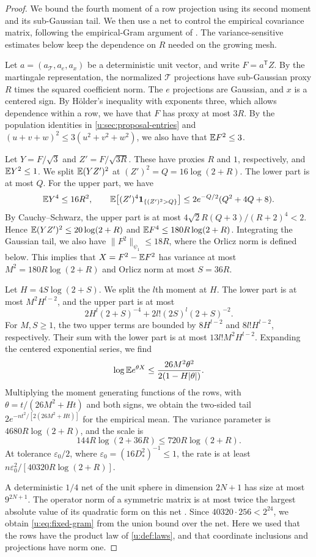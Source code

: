 \begin{proof}
We bound the fourth moment of a row projection using its second moment
and its sub-Gaussian tail. We then use a net to control the empirical
covariance matrix, following the empirical-Gram argument of
\cite[Section~4, proof of Proposition~5]{oai-typical-upper}. The
variance-sensitive estimates below keep the dependence on $R$ needed
on the growing mesh.

Let $a=(a_{\mathcal T},a_e,a_x)$ be a deterministic unit vector, and
write $F=a^{\mathsf T}Z$. By the martingale representation, the
normalized $\mathcal T$ projections have sub-Gaussian proxy $R$ times
the squared coefficient norm. The $e$ projections are Gaussian, and
$x$ is a centered sign. By H\"older's inequality with exponents three,
which allows dependence within a row, we have that $F$ has proxy at
most $3R$. By the
population identities in \cref{u:sec:proposal-entries} and
$(u+v+w)^2\le3(u^2+v^2+w^2)$, we also have that $\mathbb E F^2\le3$.

Let $Y=F/\sqrt3$ and $Z'=F/\sqrt{3R}$. These have proxies $R$ and $1$,
respectively, and $\mathbb E Y^2\le1$. We split $\mathbb E(YZ')^2$ at
$(Z')^2=Q=16\log(2+R)$. The lower part is at most $Q$. For the upper
part, we have
\[
 \mathbb E Y^4\le16R^2,\qquad
 \mathbb E\bigl[(Z')^4\mathbf 1_{\{(Z')^2>Q\}}\bigr]
 \le2e^{-Q/2}(Q^2+4Q+8).
\]
By Cauchy--Schwarz, the upper part is at most
$4\sqrt2R(Q+3)/(R+2)^4<2$. Hence
$\mathbb E(YZ')^2\le20\log(2+R)$ and
$\mathbb E F^4\le180R\log(2+R)$. Integrating the Gaussian tail, we also have
$\|F^2\|_{\psi_1}\le18R$, where the Orlicz norm is defined below.
This implies that $X=F^2-\mathbb E F^2$ has variance at most
$M^2=180R\log(2+R)$ and Orlicz norm at most $S=36R$.

Let $H=4S\log(2+S)$. We split the $l$th moment at $H$. The lower
part is at most $M^2H^{l-2}$, and the upper part is at most
\[
 2H^l(2+S)^{-4}+2l!(2S)^l(2+S)^{-2}.
\]
For $M,S\ge1$, the two upper terms are bounded by $8H^{l-2}$ and
$8l!H^{l-2}$, respectively. Their sum with the lower part is at most
$13l!M^2H^{l-2}$. Expanding the centered exponential series, we find
\[
 \log\mathbb E e^{\theta X}
 \le\frac{26M^2\theta^2}{2(1-H|\theta|)}.
\]
Multiplying the moment generating functions of the rows, with
$\theta=t/(26M^2+Ht)$ and both signs, we obtain the two-sided tail
$2e^{-nt^2/[2(26M^2+Ht)]}$ for the empirical mean. The variance
parameter is $4680R\log(2+R)$, and the scale is
\[
 144R\log(2+36R)\le720R\log(2+R).
\]
At tolerance $\varepsilon_0/2$, where
$\varepsilon_0=(16D_*^2)^{-1}\le1$, the rate is at least
$n\varepsilon_0^2/[40320R\log(2+R)]$.

A deterministic $1/4$ net of the unit sphere in dimension $2N+1$ has
size at most $9^{2N+1}$. The operator norm of a symmetric matrix is at
most twice the largest absolute value of its quadratic form on this
net \cite[Corollary~4.2.13 and Exercise~4.4.3(b)]{vershynin-2018}.
Since $40320\cdot256<2^{24}$, we obtain \eqref{u:eq:fixed-gram}
from the union bound over the net. Here we used that the rows have the
product law of \cref{u:def:laws}, and that coordinate inclusions and
projections have norm one.
\end{proof}

